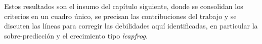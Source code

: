 
Estos resultados son el insumo del capítulo siguiente, donde se consolidan los criterios en un cuadro único, se precisan las contribuciones del trabajo y se discuten las líneas para corregir las debilidades aquí identificadas, en particular la sobre-predicción y el crecimiento tipo \textit{leapfrog}.
